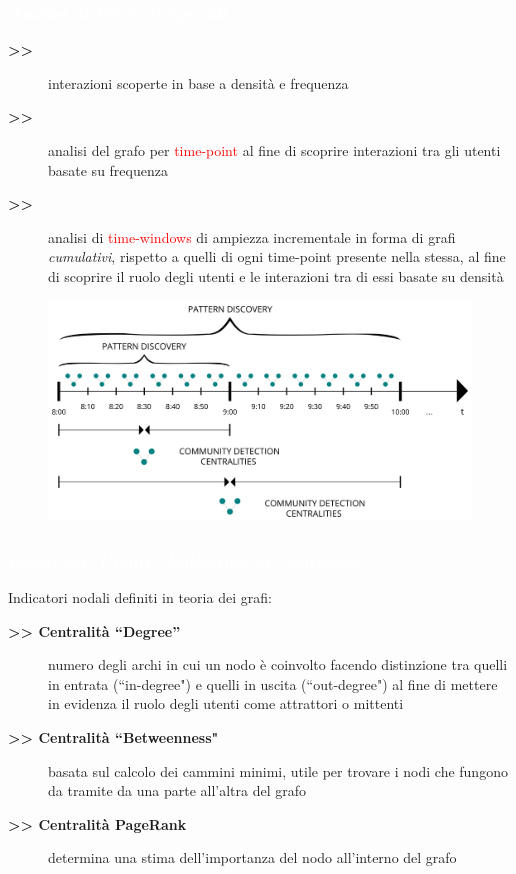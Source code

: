 \documentclass[11pt,xcolor={usenames,dvipsnames,svgnames},compress]{beamer}
\newcommand{\highlighttext}[2][yellow]{{\colorbox{#1}{\textcolor{white}{#2}}}}
\begin{document}
\begin{frame}
  \frametitle{\highlighttext[peas3]{\textbf{\emph{Analisi di Grafi Temporali}}}}
  
   \begin{description}
  \item[\textbf{>>}] interazioni scoperte in base a densit{\`a} e frequenza
  \item[\textbf{>>}] analisi del grafo per \textcolor{red}{time-point} al fine di scoprire interazioni tra gli utenti basate su frequenza
    \item[\textbf{>>}] analisi di \textcolor{red}{time-windows} di ampiezza incrementale in forma di grafi \textit{cumulativi}, rispetto a quelli di ogni time-point presente nella stessa, al fine di scoprire il ruolo degli utenti e le interazioni tra di essi basate su densit{\`a}
  \end{description} 

\begin{figure}\centering
\includegraphics[scale=0.20]{img/temp-graph}
\end{figure} 
 
\end{frame}
 
\begin{frame}
\frametitle{\highlighttext[peas3]{\textbf{\emph{Ruolo dell'Utente: Indicatori di Centralit{\`a}}}}}

  Indicatori nodali definiti in teoria dei grafi:   
  
 \begin{description}
  \item[\textbf{>> Centralit{\`a} ``Degree''}] numero degli archi in cui un nodo {\`e} coinvolto facendo distinzione tra quelli in entrata (``in-degree") e quelli in uscita (``out-degree") al fine di mettere in evidenza il ruolo degli utenti come attrattori o mittenti \par
  \item[\textbf{>> Centralit{\`a} ``Betweenness"}] basata sul calcolo dei cammini minimi, utile per trovare i nodi che fungono da tramite da una parte all'altra del grafo \par
  \item[\textbf{>> Centralit{\`a} PageRank}] determina una stima dell'importanza del nodo all'interno del grafo
  \end{description}\bigskip
 
\end{frame}
\end{document}
